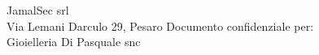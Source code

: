 \documentclass[11pt, a4paper]{awesome-cv}
\begin{document}
\makecvfooter
{JamalSec srl\\
Via Lemani Darculo 29, Pesaro}
{}
{Documento confidenziale per:\\
Gioielleria Di Pasquale snc}


\newpage

\newpage


\newpage

\newpage

\newpage

\newpage

\end{document}
